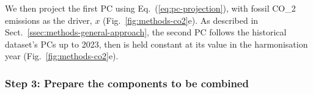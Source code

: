 We then project the first PC using Eq.~(\ref{eq:pc-projection}),
with fossil CO_2 emissions as the driver, $x$ (Fig.~\ref{fig:methods-co2}e).
As described in Sect.~\ref{ssec:methods-general-approach},
the second PC follows the historical dataset's PCs up to 2023,
then is held constant at its value in the harmonisation year (Fig.~\ref{fig:methods-co2}e).

\subsubsection{Step 3: Prepare the components to be combined}
\label{sssec:methods-co2-prepare-components}

